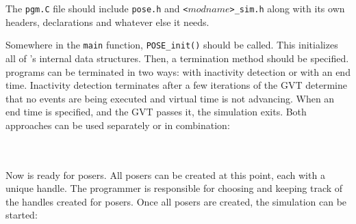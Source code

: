 The {\tt pgm.C} file should include {\tt pose.h} and {\tt<$modname$>\_sim.h}
along with its own headers, declarations and whatever else it needs.

Somewhere in the {\tt main} function, {\tt POSE\_init()} should be
called.  This initializes all of \pose{}'s internal data structures.
Then, a termination method should be specified.  \pose{} programs can
be terminated in two ways: with inactivity detection or with an end
time.  Inactivity detection terminates after a few iterations of the
GVT determine that no events are being executed and virtual time is
not advancing.  When an end time is specified, and the GVT passes it,
the simulation exits.  Both approaches can be used separately or in
combination:

~\\
\\

Now \pose{} is ready for posers.  All posers can be created at this
point, each with a unique handle.  The programmer is responsible for
choosing and keeping track of the handles created for posers.  Once
all posers are created, the simulation can be started:

~\\
\\
